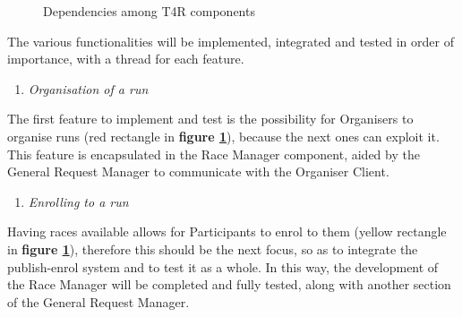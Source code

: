     \begin{figure}[h]
        \centering
        \caption{Dependencies among T4R components}
        \label{fig:T4R_DependencyDiagram}
    \end{figure}

    The various functionalities will be implemented, integrated and tested in order of importance, with a thread for each feature. 
    
    \begin{enumerate}
        \item \emph{Organisation of a run}
    \end{enumerate}
    The first feature to implement and test is the possibility for Organisers to organise runs (red rectangle in \textbf{figure \ref{fig:T4R_DependencyDiagram}}), because the next ones can exploit it. This feature is encapsulated in the Race Manager component, aided by the General Request Manager to communicate with the Organiser Client.
    
    \begin{enumerate} [resume]
        \item \emph{Enrolling to a run}
    \end{enumerate}
    Having races available allows for Participants to enrol to them (yellow rectangle in \textbf{figure \ref{fig:T4R_DependencyDiagram}}), therefore this should be the next focus, so as to integrate the publish-enrol system and to test it as a whole. In this way, the development of the Race Manager will be completed and fully tested, along with another section of the General Request Manager.
    
